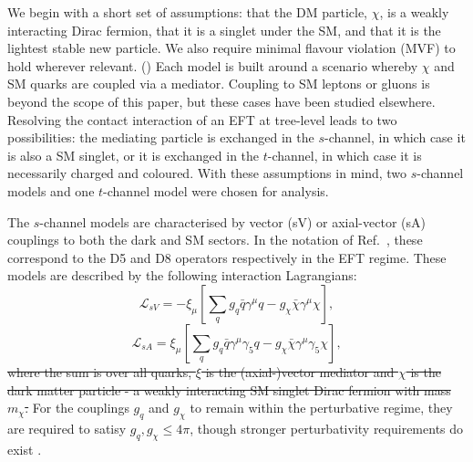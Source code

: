 \begin{flushleft}
We begin with a short set of assumptions: that the DM particle, $\chi$, is a weakly interacting Dirac fermion, that it is a singlet under the SM, and that it is the lightest stable new particle. We also require minimal flavour violation (MVF) to hold wherever relevant. () Each model is built around a scenario whereby $\chi$ and SM quarks are coupled via a mediator. Coupling to SM leptons \cite{} or gluons \cite{} is beyond the scope of this paper, but these cases have been studied elsewhere. Resolving the contact interaction of an EFT at tree-level leads to two possibilities: the mediating particle is exchanged in the $s$-channel, in which case it is also a SM singlet, or it is exchanged in the $t$-channel, in which case it is necessarily charged and coloured. With these assumptions in mind, two $s$-channel models and one $t$-channel model were chosen for analysis. 

The $s$-channel models are characterised by vector (sV) or axial-vector (sA) couplings to both the dark and SM sectors. In the notation of Ref.~\cite{DMCons2}, these correspond to the D5 and D8 operators respectively in the EFT regime. These models are described by the following interaction Lagrangians:
\begin{equation}
\label{L_int_sV}
\mathcal{L}_{sV} = - \xi_{\mu}\left[ \sum\limits_{q} g_{q}\bar{q}\gamma^{\mu}q - g_{\chi}\bar{\chi}\gamma^{\mu}\chi\right],
\end{equation}
\begin{equation}
\label{L_int_sA}
\mathcal{L}_{sA} =  \xi_{\mu}\left[\sum\limits_{q} g_{q}\bar{q}\gamma^{\mu}\gamma_{5}q - g_{\chi}\bar{\chi}\gamma^{\mu}\gamma_{5}\chi\right],
\end{equation}
\st{where the sum is over all quarks, $\xi$ is the (axial-)vector mediator and $\chi$ is the dark matter particle - a weakly interacting SM singlet Dirac fermion with mass $m_{\chi}$.}
For the couplings $g_q$ and $g_{\chi}$ to remain within the perturbative regime, they are required to satisy $g_{q},g_{\chi} \leq 4\pi$, though stronger perturbativity requirements do exist \cite{ValidEFT}.
\bigskip


\end{flushleft}
